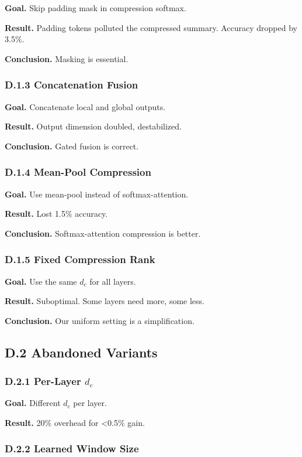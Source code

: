 \textbf{Goal.} Skip padding mask in compression softmax.

\textbf{Result.} Padding tokens polluted the compressed summary. Accuracy 
dropped by 3.5\%.

\textbf{Conclusion.} Masking is essential.

\subsubsection{D.1.3 Concatenation Fusion}

\textbf{Goal.} Concatenate local and global outputs.

\textbf{Result.} Output dimension doubled, destabilized.

\textbf{Conclusion.} Gated fusion is correct.

\subsubsection{D.1.4 Mean-Pool Compression}

\textbf{Goal.} Use mean-pool instead of softmax-attention.

\textbf{Result.} Lost 1.5\% accuracy.

\textbf{Conclusion.} Softmax-attention compression is better.

\subsubsection{D.1.5 Fixed Compression Rank}

\textbf{Goal.} Use the same $d_c$ for all layers.

\textbf{Result.} Suboptimal. Some layers need more, some less.

\textbf{Conclusion.} Our uniform setting is a simplification.

\subsection{D.2 Abandoned Variants}

\subsubsection{D.2.1 Per-Layer $d_c$}

\textbf{Goal.} Different $d_c$ per layer.

\textbf{Result.} 20\% overhead for <0.5\% gain.

\subsubsection{D.2.2 Learned Window Size}

